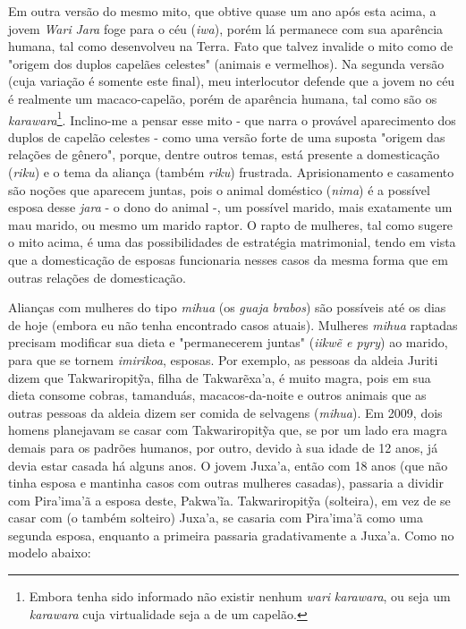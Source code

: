 Em outra versão do mesmo mito, que obtive quase um ano após esta acima,
a jovem \emph{Wari} \emph{Jara} foge para o céu (\emph{iwa}), porém lá
permanece com sua aparência humana, tal como desenvolveu na Terra. Fato
que talvez invalide o mito como de "origem dos duplos capelães celestes"
(animais e vermelhos). Na segunda versão (cuja variação é somente este
final), meu interlocutor defende que a jovem no céu é realmente um
macaco-capelão, porém de aparência humana, tal como são os
\emph{karawara}\footnote{Embora tenha sido informado não existir nenhum
  \emph{wari} \emph{karawara}, ou seja um \emph{karawara} cuja
  virtualidade seja a de um capelão.}. Inclino-me a pensar esse mito -
que narra o provável aparecimento dos duplos de capelão celestes - como
uma versão forte de uma suposta "origem das relações de gênero", porque,
dentre outros temas, está presente a domesticação (\emph{riku}) e o tema
da aliança (também \emph{riku}) frustrada. Aprisionamento e casamento
são noções que aparecem juntas, pois o animal doméstico (\emph{nima}) é
a possível esposa desse \emph{jara} - o dono do animal -, um possível
marido, mais exatamente um mau marido, ou mesmo um marido raptor. O
rapto de mulheres, tal como sugere o mito acima, é uma das
possibilidades de estratégia matrimonial, tendo em vista que a
domesticação de esposas funcionaria nesses casos da mesma forma que em
outras relações de domesticação.

Alianças com mulheres do tipo \emph{mihua} (os \emph{guaja}
\emph{brabos}) são possíveis até os dias de hoje (embora eu não tenha
encontrado casos atuais). Mulheres \emph{mihua} raptadas precisam
modificar sua dieta e "permanecerem juntas" (\emph{iikwẽ e pyry}) ao
marido, para que se tornem \emph{imirikoa}, esposas. Por exemplo, as
pessoas da aldeia Juriti dizem que Takwariropitỹa, filha de Takwarẽxa'a,
é muito magra, pois em sua dieta consome cobras, tamanduás,
macacos-da-noite e outros animais que as outras pessoas da aldeia dizem
ser comida de selvagens (\emph{mihua}). Em 2009, dois homens planejavam
se casar com Takwariropitỹa que, se por um lado era magra demais para os
padrões humanos, por outro, devido à sua idade de 12 anos, já devia
estar casada há alguns anos. O jovem Juxa'a, então com 18 anos (que não
tinha esposa e mantinha casos com outras mulheres casadas), passaria a
dividir com Pira'ima'ã a esposa deste, Pakwa'ĩa. Takwariropitỹa
(solteira), em vez de se casar com (o também solteiro) Juxa'a, se
casaria com Pira'ima'ã como uma segunda esposa, enquanto a primeira
passaria gradativamente a Juxa'a. Como no modelo abaixo:

